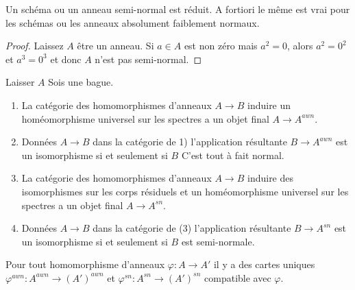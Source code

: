 \begin{lemma}

\label{lemma-seminormal-reduced}

Un schéma ou un anneau semi-normal est réduit. A fortiori le même est vrai pour les schémas ou les anneaux absolument faiblement normaux.

\end{lemma}

\begin{proof}
Laissez $A$ être un anneau. Si $a \in A$ est non zéro mais $a^2 = 0$, alors $a^2 = 0^2$ et $a^3 = 0^3$ et donc $A$ n'est pas semi-normal.
\end{proof}

\begin{lemma}

\label{lemma-seminormalization-ring}

Laisser $A$ Sois une bague.

\begin{enumerate}

\item La catégorie des homomorphismes d'anneaux $A \to B$ induire un homéomorphisme universel sur les spectres a un objet final $A \to A^{awn}$.
\item Données $A \to B$ dans la catégorie de 1) l'application résultante
$B \to A^{awn}$ est un isomorphisme si et seulement si $B$ C'est tout à fait normal.
\item La catégorie des homomorphismes d'anneaux $A \to B$ induire des isomorphismes sur les corps résiduels et un homéomorphisme universel sur les spectres a un objet final $A \to A^{sn}$.
\item Données $A \to B$ dans la catégorie de (3) l'application résultante
$B \to A^{sn}$ est un isomorphisme si et seulement si $B$ est semi-normale.

\end{enumerate}

Pour tout homomorphisme d'anneaux $\varphi : A \to A'$ il y a des cartes uniques
$\varphi^{awn} : A^{awn} \to (A')^{awn}$ et
$\varphi^{sn} : A^{sn} \to (A')^{sn}$ compatible avec $\varphi$.

\end{lemma}

